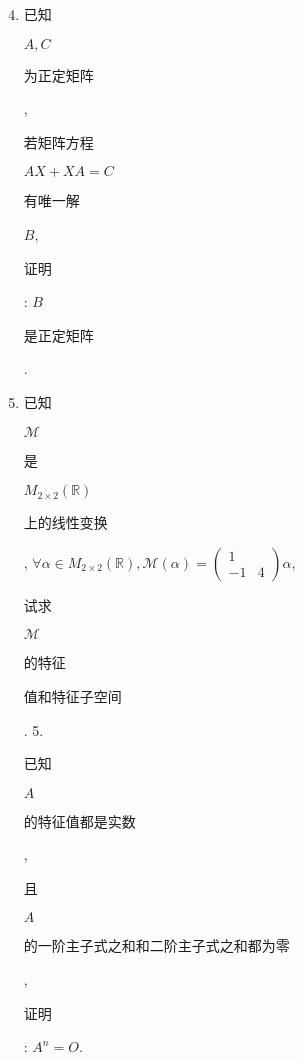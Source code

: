 \documentclass[10pt]{article}
\begin{document}
\begin{enumerate}
  \setcounter{enumi}{3}
  \item \begin{CJK}{UTF8}{mj}已知\end{CJK} $A, C$ \begin{CJK}{UTF8}{mj}为正定矩阵\end{CJK}, \begin{CJK}{UTF8}{mj}若矩阵方程\end{CJK} $A X+X A=C$ \begin{CJK}{UTF8}{mj}有唯一解\end{CJK} $B$, \begin{CJK}{UTF8}{mj}证明\end{CJK}: $B$ \begin{CJK}{UTF8}{mj}是正定矩阵\end{CJK}.

  \item \begin{CJK}{UTF8}{mj}已知\end{CJK} $\mathscr{M}$ \begin{CJK}{UTF8}{mj}是\end{CJK} $M_{2 \times 2}(\mathbb{R})$ \begin{CJK}{UTF8}{mj}上的线性变换\end{CJK}, $\forall \alpha \in M_{2 \times 2}(\mathbb{R}), \mathscr{M}(\alpha)=\left(\begin{array}{cc}1 \\ -1 & 4\end{array}\right) \alpha$, \begin{CJK}{UTF8}{mj}试求\end{CJK} $\mathscr{M}$ \begin{CJK}{UTF8}{mj}的特征\end{CJK} \begin{CJK}{UTF8}{mj}值和特征子空间\end{CJK}. 5. \begin{CJK}{UTF8}{mj}已知\end{CJK} $A$ \begin{CJK}{UTF8}{mj}的特征值都是实数\end{CJK}, \begin{CJK}{UTF8}{mj}且\end{CJK} $A$ \begin{CJK}{UTF8}{mj}的一阶主子式之和和二阶主子式之和都为零\end{CJK}, \begin{CJK}{UTF8}{mj}证明\end{CJK}: $A^{n}=O$.


\end{enumerate}
\end{document}
